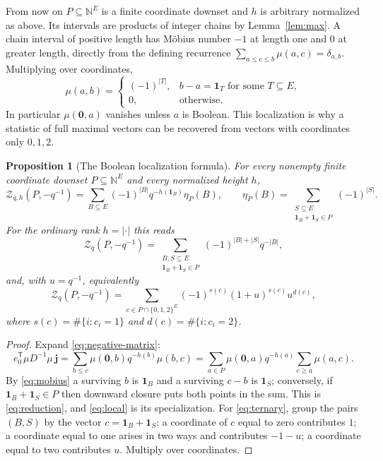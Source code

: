 \documentclass[11pt]{article}
\numberwithin{equation}{section}
\newtheorem{proposition}[theorem]{Proposition}
\theoremstyle{definition}
\theoremstyle{remark}
\newcommand{\N}{\mathbb N}
\newcommand{\one}{\mathbf 1}
\newcommand{\zero}{\mathbf 0}
\newcommand{\Zeta}{\mathcal Z}
\begin{document}
From now on $P\subseteq\N^E$ is a finite coordinate downset and $h$ is
arbitrary normalized as above. Its intervals are products of integer chains by
Lemma~\ref{lem:max}. A chain interval of positive length has M\"obius number
$-1$ at length one and $0$ at greater length, directly from the defining
recurrence $\sum_{a\le c\le b}\mu(a,c)=\delta_{a,b}$. Multiplying over
coordinates,
\begin{equation}
 \mu(a,b)=
 \begin{cases}
 (-1)^{|T|},&b-a=\one_T\text{ for some }T\subseteq E,\\
 0,&\text{otherwise}.
 \end{cases}
 \label{eq:mobius}
\end{equation}
In particular $\mu(\zero,a)$ vanishes unless $a$ is Boolean. This
localization is why a statistic of full maximal vectors can be recovered from
vectors with coordinates only $0,1,2$.

\begin{proposition}[The Boolean localization formula]
\label{prop:local}
For every nonempty finite coordinate downset $P\subseteq\N^E$ and every
normalized height $h$,
\begin{equation}
 \Zeta_{q,h}(P,-q^{-1})
 =\sum_{B\subseteq E}(-1)^{|B|}q^{-h(\one_B)}\eta_P(B),
 \qquad
 \eta_P(B)=\sum_{\substack{S\subseteq E\\\one_B+\one_S\in P}}(-1)^{|S|}.
 \label{eq:reduction}
\end{equation}
For the ordinary rank $h=|\cdot|$ this reads
\begin{equation}
 \Zeta_q(P,-q^{-1})
 =\sum_{\substack{B,S\subseteq E\\\one_B+\one_S\in P}}
   (-1)^{|B|+|S|}q^{-|B|},
 \label{eq:local}
\end{equation}
and, with $u=q^{-1}$, equivalently
\begin{equation}
 \Zeta_q(P,-q^{-1})
 =\sum_{c\in P\cap\{0,1,2\}^E}
   (-1)^{s(c)}(1+u)^{s(c)}u^{d(c)},
 \label{eq:ternary}
\end{equation}
where $s(c)=\#\{i:c_i=1\}$ and $d(c)=\#\{i:c_i=2\}$.
\end{proposition}

\begin{proof}
Expand \eqref{eq:negative-matrix}:
\[
 e_0^{\mathsf T}\mu D^{-1}\mu\,\mathbf j
 =\sum_{b\le c}\mu(\zero,b)q^{-h(b)}\mu(b,c)
 =\sum_{a\in P}\mu(\zero,a)q^{-h(a)}\sum_{c\ge a}\mu(a,c).
\]
By \eqref{eq:mobius} a surviving $b$ is $\one_B$ and a surviving $c-b$ is
$\one_S$; conversely, if $\one_B+\one_S\in P$ then downward closure puts both
points in the sum. This is \eqref{eq:reduction}, and \eqref{eq:local} is its
specialization. For \eqref{eq:ternary}, group the pairs $(B,S)$ by the vector
$c=\one_B+\one_S$: a coordinate of $c$ equal to zero contributes $1$; a
coordinate equal to one arises in two ways and contributes $-1-u$; a
coordinate equal to two contributes $u$. Multiply over coordinates.
\end{proof}
\end{document}
